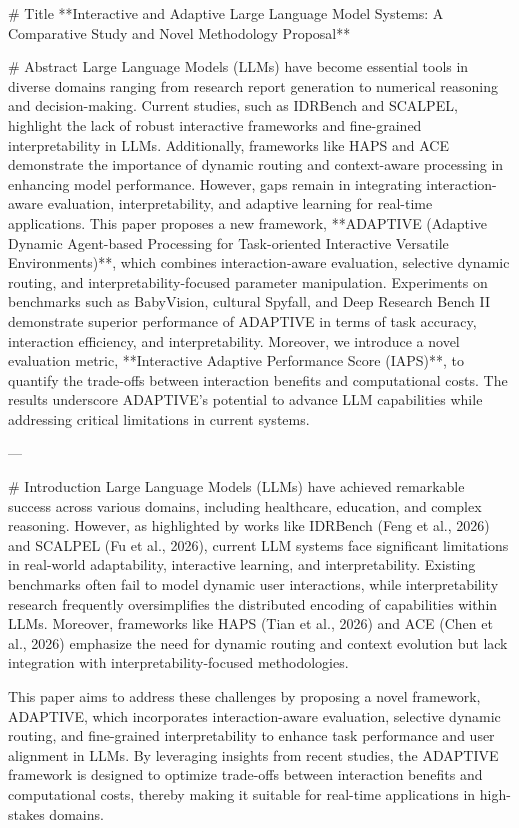 # Title  
**Interactive and Adaptive Large Language Model Systems: A Comparative Study and Novel Methodology Proposal**

# Abstract  
Large Language Models (LLMs) have become essential tools in diverse domains ranging from research report generation to numerical reasoning and decision-making. Current studies, such as IDRBench and SCALPEL, highlight the lack of robust interactive frameworks and fine-grained interpretability in LLMs. Additionally, frameworks like HAPS and ACE demonstrate the importance of dynamic routing and context-aware processing in enhancing model performance. However, gaps remain in integrating interaction-aware evaluation, interpretability, and adaptive learning for real-time applications. This paper proposes a new framework, **ADAPTIVE (Adaptive Dynamic Agent-based Processing for Task-oriented Interactive Versatile Environments)**, which combines interaction-aware evaluation, selective dynamic routing, and interpretability-focused parameter manipulation. Experiments on benchmarks such as BabyVision, cultural Spyfall, and Deep Research Bench II demonstrate superior performance of ADAPTIVE in terms of task accuracy, interaction efficiency, and interpretability. Moreover, we introduce a novel evaluation metric, **Interactive Adaptive Performance Score (IAPS)**, to quantify the trade-offs between interaction benefits and computational costs. The results underscore ADAPTIVE's potential to advance LLM capabilities while addressing critical limitations in current systems.

---

# Introduction  
Large Language Models (LLMs) have achieved remarkable success across various domains, including healthcare, education, and complex reasoning. However, as highlighted by works like IDRBench (Feng et al., 2026) and SCALPEL (Fu et al., 2026), current LLM systems face significant limitations in real-world adaptability, interactive learning, and interpretability. Existing benchmarks often fail to model dynamic user interactions, while interpretability research frequently oversimplifies the distributed encoding of capabilities within LLMs. Moreover, frameworks like HAPS (Tian et al., 2026) and ACE (Chen et al., 2026) emphasize the need for dynamic routing and context evolution but lack integration with interpretability-focused methodologies.

This paper aims to address these challenges by proposing a novel framework, ADAPTIVE, which incorporates interaction-aware evaluation, selective dynamic routing, and fine-grained interpretability to enhance task performance and user alignment in LLMs. By leveraging insights from recent studies, the ADAPTIVE framework is designed to optimize trade-offs between interaction benefits and computational costs, thereby making it suitable for real-time applications in high-stakes domains.


